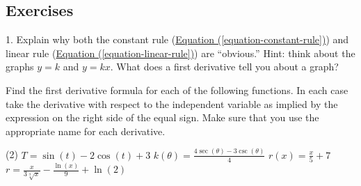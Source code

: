 \documentclass[12pt,]{book}
\theoremstyle{plain}
\theoremstyle{definition}
\numberwithin{equation}{section}
\newcommand{\fe}[2]{#1\mathopen{}\left(#2\right)\mathclose{}}
\begin{document}
\subsection[Exercises]{Exercises}\label{exercises-36}
\begin{exerciselist}
\item[1.]\hypertarget{exercise-366}{\null}Explain why both the constant rule (\hyperref[equation-constant-rule]{Equation (\ref{equation-constant-rule})}) and linear rule (\hyperref[equation-linear-rule]{Equation (\ref{equation-linear-rule})}) are ``obvious.'' Hint: think about the graphs \(y=k\) and \(y=kx\).  What does a first derivative tell you about a graph?%
\par\smallskip
\end{exerciselist}
Find the first derivative formula for each of the following functions.  In each case take the derivative with respect to the independent variable as implied by the expression on the right side of the equal sign.  Make sure that you use the appropriate name for each derivative.%
\par
\begin{exercisegroup}(2)
\exercise[2.]\hypertarget{exercise-367}{\null}\(T=\fe{\sin}{t}-2\fe{\cos}{t}+3\)%
\exercise[3.]\hypertarget{exercise-368}{\null}\(\fe{k}{\theta}=\frac{4\fe{\sec}{\theta}-3\fe{\csc}{\theta}}{4}\)%
\exercise[4.]\hypertarget{exercise-369}{\null}\(\fe{r}{x}=\frac{x}{5}+7\)%
\exercise[5.]\hypertarget{exercise-370}{\null}\(r=\frac{x}{3\sqrt[3]{x}}-\frac{\fe{\ln}{x}}{9}+\fe{\ln}{2}\)%
\end{exercisegroup}
\par\smallskip\noindent
\typeout{************************************************}
\typeout{************************************************}
\end{document}

